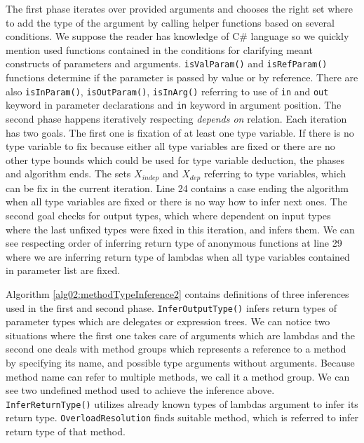 \par
{}
The first phase iterates over provided arguments and chooses the right set where to add the type of the argument by calling helper functions based on several conditions.
We suppose the reader has knowledge of C\# language so we quickly mention used functions contained in the conditions for clarifying meant constructs of parameters and arguments.
\texttt{isValParam()} and \texttt{isRefParam()} functions determine if the parameter is passed by value or by reference.
There are also \texttt{isInParam()}, \texttt{isOutParam()}, \texttt{isInArg()} referring to use of \texttt{in} and \texttt{out} keyword in parameter declarations and \texttt{in} keyword in argument position.
The second phase happens iteratively respecting \textit{depends on} relation.
Each iteration has two goals.
The first one is fixation of at least one type variable.
If there is no type variable to fix because either all type variables are fixed or there are no other type bounds which could be used for type variable deduction, the phases and algorithm ends.
The sets \texttt{$X_{indep}$} and \texttt{$X_{dep}$} referring to type variables, which can be fix in the current iteration.
Line 24 contains a case ending the algorithm when all type variables are fixed or there is no way how to infer next ones.
The second goal checks for output types, which where dependent on input types where the last unfixed types were fixed in this iteration, and infers them.
We can see respecting order of inferring return type of anonymous functions at line 29 where we are inferring return type of lambdas when all type variables contained in parameter list are fixed.
\par
{}
Algorithm \ref{alg02:methodTypeInference2} contains definitions of three inferences used in the first and second phase.
\texttt{InferOutputType()} infers return types of parameter types which are delegates or expression trees.
We can notice two situations where the first one takes care of arguments which are lambdas and the second one deals with method groups which represents a reference to a method by specifying its name, and possible type arguments without arguments.
Because method name can refer to multiple methods, we call it a method group.
We can see two undefined method used to achieve the inference above.
\texttt{InferReturnType()} utilizes already known types of lambdas argument to infer its return type.
\texttt{OverloadResolution} finds suitable method, which is referred to infer return type of that method. 
